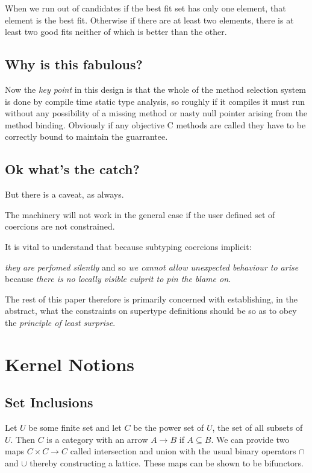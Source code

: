 \documentclass[oneside]{book}
\begin{document}
When we run out of candidates if the best fit set has only one element,
that element is the best fit. Otherwise if there are at least two elements,
there is at least two good fits neither of which is better than the other.

\section{Why is this fabulous?}

Now the {\em key point} in this design is that the whole of the method
selection system is done by compile time static type analysis,
so roughly if it compiles it must run without any possibility of
a missing method or nasty null pointer arising from the method binding.
Obviously if any objective C methods are called they have to be
correctly bound to maintain the guarrantee.

\section{Ok what's the catch?}
But there is a caveat, as always.

The machinery will not work in the general case
if the user defined set of coercions are not constrained.

It is vital to understand that because subtyping coercions implicit:

{\em they are perfomed silently} and so {\em we cannot allow 
unexpected behaviour to arise} because {\em there is no locally visible
culprit to pin the blame on.}

The rest of this paper therefore is primarily concerned with
establishing, in the abstract, what the constraints on
supertype definitions should be so as to obey the
{\em principle of least surprise}.


\chapter{Kernel Notions}

\section{Set Inclusions}
Let $U$ be some finite set and let $C$ be the power set of $U$, the set of all
subsets of $U$. Then $C$ is a category with an arrow $A\rightarrow B$ if $A \subseteq B$.
We can provide two maps $C \times C \rightarrow C$ called intersection and union 
with the usual binary operators $\cap$ and $\cup$ thereby constructing a lattice.
These maps can be shown to be bifunctors.
\end{document}
